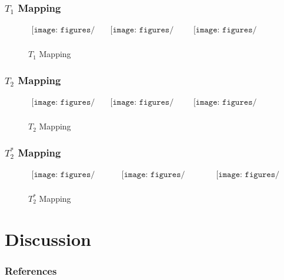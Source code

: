 \documentclass{beamer}
\begin{document}
	\begin{frame}
		\frametitle{$T_1$ Mapping}
		\begin{figure}
			$\begin{array}{ccc}
				\texttt{[image: figures/T1\_map/T1\_6week\_map.png]}
				&
				\texttt{[image: figures/T1\_map/T1\_4month\_map.png]}
				&
				\texttt{[image: figures/T1\_map/T1\_20month\_map.png]}
				\\
				\end{array}$
			\caption{$T_1$ Mapping}
		\end{figure}
	\end{frame}

		\begin{frame}
		\frametitle{$T_2$ Mapping}
		\begin{figure}
			$\begin{array}{ccc}
			\texttt{[image: figures/T2\_map/T2\_6week\_map.png]}
			&
			\texttt{[image: figures/T2\_map/T2\_4month\_map.png]}
			&
			\texttt{[image: figures/T2\_map/T2\_20month\_map.png]}
			\\
			\end{array}$
			\caption{$T_2$ Mapping}
		\end{figure}
	\end{frame}
	
	\begin{frame}
		\frametitle{$T_2^*$ Mapping}
		\begin{figure}
			$\begin{array}{ccc}
			\texttt{[image: figures/T2star\_map/T2star\_6week\_map.png]}
			&
			\texttt{[image: figures/T2star\_map/T2star\_4month\_map.png]}
			&
			\texttt{[image: figures/T2star\_map/T2star\_20month\_map.png]}
			\\
			\end{array}$
			\caption{$T_2^*$ Mapping}
		\end{figure}
	\end{frame}
	
	\section{Discussion}
	
	\begin{frame}[allowframebreaks]
		\frametitle{References}
		
		
	\end{frame}
\end{document}
